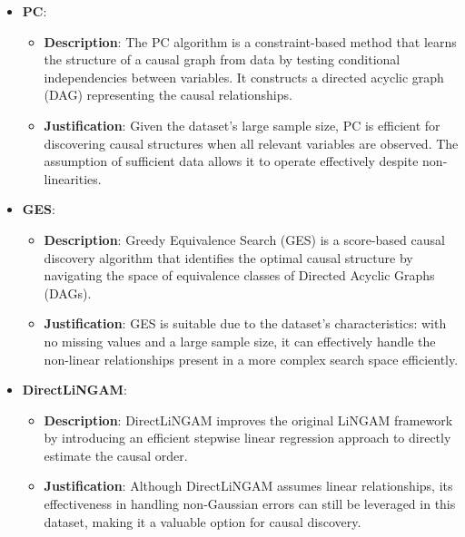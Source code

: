 \documentclass{article}
\begin{document}
        \begin{itemize}

        
                        \item \textbf{PC}:
                        \begin{itemize}
                            \item \textbf{Description}: The PC algorithm is a constraint-based method that learns the structure of a causal graph from data by testing conditional independencies between variables. It constructs a directed acyclic graph (DAG) representing the causal relationships.
                            \item \textbf{Justification}: Given the dataset's large sample size, PC is efficient for discovering causal structures when all relevant variables are observed. The assumption of sufficient data allows it to operate effectively despite non-linearities.
                        \end{itemize}

                         
                        \item \textbf{GES}:
                        \begin{itemize}
                            \item \textbf{Description}: Greedy Equivalence Search (GES) is a score-based causal discovery algorithm that identifies the optimal causal structure by navigating the space of equivalence classes of Directed Acyclic Graphs (DAGs).
                            \item \textbf{Justification}: GES is suitable due to the dataset's characteristics: with no missing values and a large sample size, it can effectively handle the non-linear relationships present in a more complex search space efficiently.
                        \end{itemize}

                         
                        \item \textbf{DirectLiNGAM}:
                        \begin{itemize}
                            \item \textbf{Description}: DirectLiNGAM improves the original LiNGAM framework by introducing an efficient stepwise linear regression approach to directly estimate the causal order.
                            \item \textbf{Justification}: Although DirectLiNGAM assumes linear relationships, its effectiveness in handling non-Gaussian errors can still be leveraged in this dataset, making it a valuable option for causal discovery.
                        \end{itemize}

                         
                    \end{itemize}
                    
\end{document}
